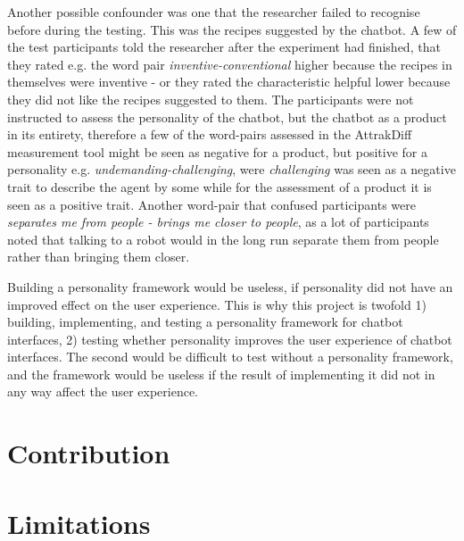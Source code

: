 Another possible confounder was one that the researcher failed to recognise before during the testing. This was the recipes suggested by the chatbot. A few of the test participants told the researcher after the experiment had finished, that they rated e.g. the word pair \textit{inventive-conventional} higher because the recipes in themselves were inventive - or they rated the characteristic helpful lower because they did not like the recipes suggested to them. The participants were not instructed to assess the personality of the chatbot, but the chatbot as a product in its entirety, therefore a few of the word-pairs assessed in the AttrakDiff measurement tool might be seen as negative for a product, but positive for a personality e.g. \textit{undemanding-challenging}, were \textit{challenging} was seen as a negative trait to describe the agent by some while for the assessment of a product it is seen as a positive trait. Another word-pair that confused participants were \textit{separates me from people - brings me closer to people}, as a lot of participants noted that talking to a robot would in the long run separate them from people rather than bringing them closer.

Building a personality framework would be useless, if personality did not have an improved effect on the user experience. This is why this project is twofold 1) building, implementing, and testing a personality framework for chatbot interfaces, 2) testing whether personality improves the user experience of chatbot interfaces. The second would be difficult to test without a personality framework, and the framework would be useless if the result of implementing it did not in any way affect the user experience.

\section{Contribution}

\section{Limitations}

